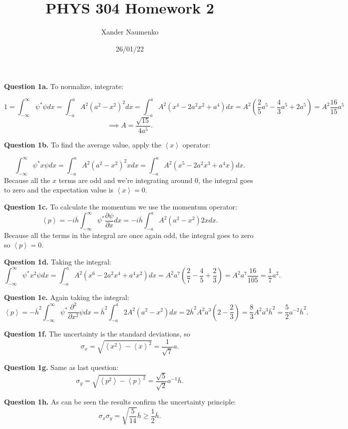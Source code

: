 \documentclass[letterpaper, reqno,11pt]{article}
\begin{document}
\title{PHYS 304 Homework 2}
\date{26/01/22}
\author{Xander Naumenko}
\maketitle

{\noindent\bf Question 1a.} To normalize, integrate: 

\[
1=\int_{-\infty}^{\infty}\psi^*\psi dx=\int_{-a}^{a}A^2(a^2-x^2)^2dx=\int_{-a}^aA^2(x^{4}-2a^2x^2+a^{4})dx=A^2\left( \frac{2}{5}a^{5}-\frac{4}{3}a^{5}+2a^{5} \right) =A^2 \frac{16}{15}a^{5}
\]
\[
\implies A=\frac{\sqrt{15}}{4a^{5}}
.\]

{\noindent\bf Question 1b.} To find the average value, apply the $ \left<x \right>$ operator: 

\[
\int_{-\infty}^{\infty}\psi^* x\psi dx=\int_{-a}^{a}A^2(a^2-x^2)^2 xdx=\int_{-a}^aA^2(x^{5}-2a^2x^3+a^{4}x)dx
.\]
Because all the $x$ terms are odd and we're integrating around $0$, the integral goes to zero and the expectation value is $ \left<x \right>=0$. 

{\noindent\bf Question 1c.} To calculate the momentum we use the momentum operator: 
\[
\left<p \right>=-i\overline{h}\int_{-\infty}^{\infty}\psi^*\frac{\partial\psi}{\partial x}dx=-i\overline{h}\int_{-a}^a A^2(a^2-x^2)2xdx
.\]
Because all the terms in the integral are once again odd, the integral goes to zero so $ \left<p \right>=0$. 

{\noindent\bf Question 1d.} Taking the integral: 
\[
\int_{-\infty}^{\infty}\psi^* x^2\psi dx=\int_{-a}^{a}A^2(x^{6}-2a^2x^{4}+a^{4}x^2)dx=A^2a^{7}\left( \frac{2}{7}-\frac{4}{5}+\frac{2}{3}\right)=A^2a^{7}\frac{16}{105}=\frac{1}{7}a^{2}
.\]

{\noindent\bf Question 1e.} Again taking the integral: 
\[
\left<p \right>=-\overline{h}^2\int_{-\infty}^{\infty}\psi^* \frac{\partial^2}{\partial x^2}\psi dx=\overline{h}^2\int_{-a}^{a}2A^2(a^2-x^2)dx=2\overline{h}^2A^2a^{3}\left( 2-\frac{2}{3} \right) =\frac{8}{3}A^2a^{3}\overline{h}^2=\frac{5}{2}a^{-2}\overline{h}^2
.\]

{\noindent\bf Question 1f.} The uncertainty is the standard deviations, so 
\[
\sigma_x=\sqrt{\left<x^2 \right>-\left<x \right>^2}=\frac{1}{\sqrt{7} }a
.\]

{\noindent\bf Question 1g.} Same as last question: 
\[
\sigma_y=\sqrt{\left<p^2 \right>-\left<p \right>^2}=\frac{\sqrt{5} }{\sqrt{2} }a^{-1}\overline{h}
.\]

{\noindent\bf Question 1h.} As can be seen the results confirm the uncertainty principle: 
\[
\sigma_x\sigma_y=\sqrt{\frac{5}{14}} \overline{h}\geq \frac{1}{2}\overline{h}
.\]
\end{document}
